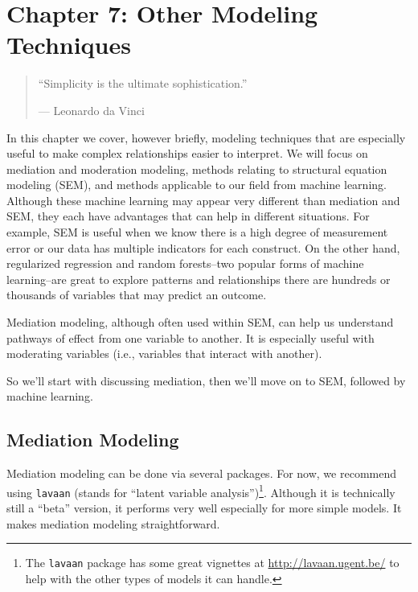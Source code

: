 \documentclass[]{tufte-book}
\theoremstyle{definition}
\theoremstyle{definition}
\theoremstyle{remark}
\begin{document}
\chapter*{Chapter 7: Other Modeling
Techniques}\label{chapter-7-other-modeling-techniques}

\begin{quote}
``Simplicity is the ultimate sophistication.''

--- Leonardo da Vinci
\end{quote}

In this chapter we cover, however briefly, modeling techniques that are
especially useful to make complex relationships easier to interpret. We
will focus on mediation and moderation modeling, methods relating to
structural equation modeling (SEM), and methods applicable to our field
from machine learning. Although these machine learning may appear very
different than mediation and SEM, they each have advantages that can
help in different situations. For example, SEM is useful when we know
there is a high degree of measurement error or our data has multiple
indicators for each construct. On the other hand, regularized regression
and random forests--two popular forms of machine learning--are great to
explore patterns and relationships there are hundreds or thousands of
variables that may predict an outcome.

Mediation modeling, although often used within SEM, can help us
understand pathways of effect from one variable to another. It is
especially useful with moderating variables (i.e., variables that
interact with another).

So we'll start with discussing mediation, then we'll move on to SEM,
followed by machine learning.

\section*{Mediation Modeling}\label{mediation-modeling}

Mediation modeling can be done via several packages. For now, we
recommend using \texttt{lavaan} (stands for ``latent variable
analysis'')\footnote{The \texttt{lavaan} package has some great
  vignettes at \url{http://lavaan.ugent.be/} to help with the other
  types of models it can handle.}. Although it is technically still a
``beta'' version, it performs very well especially for more simple
models. It makes mediation modeling straightforward.
\end{document}
